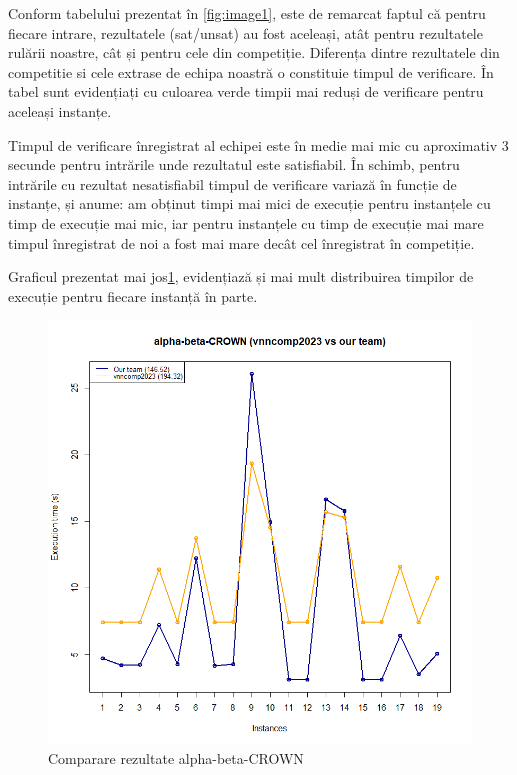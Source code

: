 Conform tabelului prezentat în \ref{fig:image1}, este de remarcat faptul că pentru fiecare intrare, rezultatele (sat/unsat) au fost aceleași, atât pentru rezultatele rulării noastre, cât și pentru cele din competiție. Diferența dintre rezultatele din competitie si cele extrase de echipa noastră o constituie timpul de verificare.
În tabel sunt evidențiați cu culoarea verde timpii mai reduși de verificare pentru aceleași instanțe.

Timpul de verificare înregistrat al echipei este în medie mai mic cu aproximativ 3 secunde pentru intrările unde rezultatul este satisfiabil. În schimb, pentru intrările cu rezultat nesatisfiabil timpul de verificare variază în funcție de instanțe, și anume: am obținut timpi mai mici de execuție pentru instanțele cu timp de execuție mai mic, iar pentru instanțele cu timp de execuție mai mare timpul înregistrat de noi a fost mai mare decât cel înregistrat în competiție. 

Graficul prezentat mai jos\ref{fig:image3}, evidențiază și mai mult distribuirea timpilor de execuție pentru fiecare instanță în parte.

\begin{figure}[h]
\centering 
\includegraphics[width=0.8\linewidth]{imagini/interpretare rezultate/abC_us_vs_vnncomp.png}
\caption{Comparare rezultate alpha-beta-CROWN}
\label{fig:image3} 
\end{figure}
\